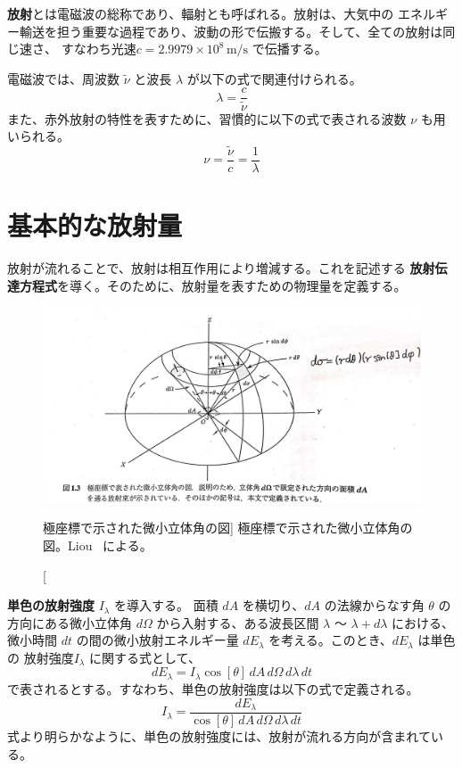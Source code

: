 \documentclass[article,twoside]{dennou777}
\newcommand{\Unit}[1]{\,\mathrm{#1}}
\newcommand{\hmemph}[1]{\textbf{#1}}
\begin{document}
\hmemph{放射}とは電磁波の総称であり、輻射とも呼ばれる\cite{asano}。放射は、大気中の
エネルギー輸送を担う重要な過程であり、波動の形で伝搬する。そして、全ての放射は同じ速さ、
すなわち光速$c=2.9979\times10^8\Unit{m/s}$ で伝播する。

電磁波では、周波数 $\tilde\nu$ と波長 $\lambda$ が以下の式で関連付けられる。
\begin{equation}
	\lambda=\frac{c}{\tilde\nu}
\end{equation}
また、赤外放射の特性を表すために、習慣的に以下の式で表される波数 $\nu$ も用いられる。
\begin{equation}
	\nu=\frac{\tilde\nu}{c}=\frac{1}{\lambda}
\end{equation}

\section{基本的な放射量}

放射が流れることで、放射は相互作用により増減する。これを記述する
\hmemph{放射伝達方程式}を導く。そのために、放射量を表すための物理量を定義する。

\begin{figure}[t]
	\includegraphics[width=\linewidth]{eq.jpg}
	\caption
		[極座標で示された微小立体角の図]
		{極座標で示された微小立体角の図。Liou~\cite{liou} による。}
\end{figure}

\hmemph{単色の放射強度} $I_\lambda$ を導入する。
面積 $dA$ を横切り、$dA$ の法線からなす角 $\theta$ の方向にある微小立体角 $d\Omega$
から入射する、ある波長区間 $\lambda$ 〜 $\lambda+d\lambda$ における、微小時間 $dt$
の間の微小放射エネルギー量 $dE_\lambda$ を考える。このとき、$dE_\lambda$ は単色の
放射強度$I_\lambda$ に関する式として、
\begin{equation}
	dE_\lambda=I_\lambda\cos[\theta]\,dA\,d\Omega\,d\lambda\,dt
\end{equation}
で表されるとする。すなわち、単色の放射強度は以下の式で定義される。
\begin{equation}
	I_\lambda=\frac{dE_\lambda}{\cos[\theta]\,dA\,d\Omega\,d\lambda\,dt}
\end{equation}
式より明らかなように、単色の放射強度には、放射が流れる方向が含まれている。
\end{document}
